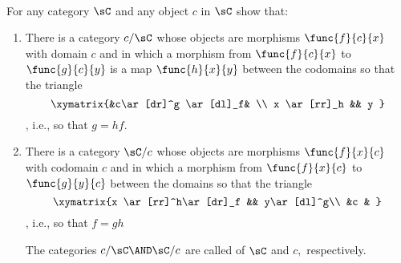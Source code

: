 \documentclass[../../main]{subfiles}
\begin{document}
\paragraph{}
\begin{exercise}
For any category \(\sC\) and any object \(c\) in \(\sC\) show that:
\begin{enumerate}
	\item There is a category \(c/\sC\) whose objects are morphisms
		\(\func{f}{c}{x}\) with domain \(c\) and in which a morphism from
		\(\func{f}{c}{x}\) to \(\func{g}{c}{y}\) is a map \(\func{h}{x}{y}\)
		between the codomains so that the triangle \[ \xymatrix{&c\ar[dr]^g
		\ar[dl]_f& \\ x \ar[rr]_h && y } \] , i.e., so that
		\(g=hf.\)

	\item There is a category \(\sC/c\) whose objects are morphisms
		\(\func{f}{x}{c}\) with codomain \(c\) and in which a morphism from
		\(\func{f}{x}{c}\) to \( \func{g}{y}{c} \) between the domains so that
		the triangle \[ \xymatrix{x \ar[rr]^h\ar[dr]_f && y\ar[dl]^g\\ &c & } \]
		, i.e., so that \(f=gh\)

		The categories \(c/\sC\AND\sC/c\) are called  of
		\(\sC\)  and  \(c,\) respectively.
\end{enumerate}
\end{exercise}
\end{document}
